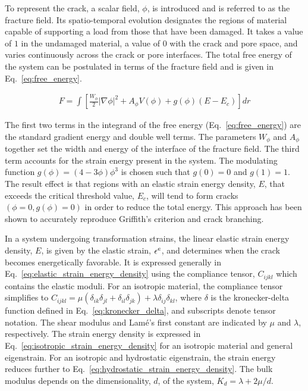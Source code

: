 To represent the crack, a scalar field, $\phi$, is introduced and is referred to as the fracture field. Its spatio-temporal evolution designates the regions of material capable of supporting a load from those that have been damaged. It takes a value of $1$ in the undamaged material, a value of $0$ with the crack and pore space, and varies continuously across the crack or pore interfaces. The total free energy of the system can be postulated in terms of the fracture field and is given in Eq.~\ref{eq:free_energy}.

\begin{align}\label{eq:free_energy}
F = \int \left[ \frac{W_{\phi}}{2}|\nabla\phi|^2 + A_{\phi}V(\phi) + g(\phi)(E - E_c)\right]dr	
\end{align}

The first two terms in the integrand of the free energy (Eq.~\ref{eq:free_energy}) are the standard gradient energy and double well terms. The parameters $W_{\phi}$ and $A_{\phi}$ together set the width and energy of the interface of the fracture field. The third term accounts for the strain energy present in the system. The modulating function $g(\phi) = (4-3\phi)\phi^3$ is chosen such that $g(0)=0$ and $g(1)=1$. The result effect is that regions with an elastic strain energy density, $E$, that exceeds the critical threshold value, $E_c$, will tend to form cracks $(\phi=0, g(\phi)=0)$ in order to reduce the total energy. This approach has been shown to accurately reproduce Griffith's criterion and crack branching.

In a system undergoing transformation strains, the linear elastic strain energy density, $E$, is given by the elastic strain, $\epsilon^e$, and determines when the crack becomes energetically favorable. It is expressed generally in Eq.~\ref{eq:elastic_strain_energy_density} using the compliance tensor, $C_{ijkl}$ which contains the elastic moduli. For an isotropic material, the compliance tensor simplifies to $C_{ijkl}=\mu(\delta_{ik}\delta_{jl} + \delta_{il}\delta_{jk}) + \lambda \delta_{ij}\delta_{kl}$, where $\delta$ is the kronecker-delta function defined in Eq.~\ref{eq:kronecker_delta}, and subscripts denote tensor notation. The shear modulus and Lam\'e's first constant are indicated by $\mu$ and $\lambda$, respectively.  The strain energy density is expressed in Eq.~\ref{eq:isotropic_strain_energy_density} for an isotropic material and general eigenstrain. For an isotropic and hydrostatic eigenstrain, the strain energy reduces further to Eq.~\ref{eq:hydrostatic_strain_energy_density}. The bulk modulus depends on the dimensionality, $d$, of the system, $K_d = \lambda+2\mu/d$.


